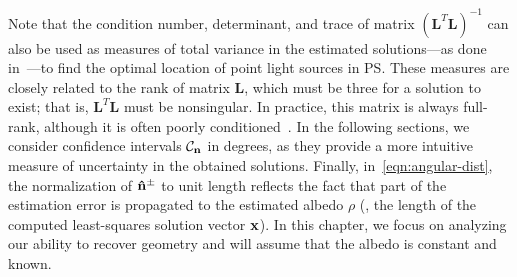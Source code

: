 Note that the condition number, determinant, and trace of matrix $(\mathbf{L}^T\mathbf{L})^{-1}$ can also be used as measures of total variance in the estimated solutions---as done in~\cite{sun-ivc-07}---to find the optimal location of point light sources in PS. These measures are closely related to the rank of matrix $\mathbf{L}$, which must be three for a solution to exist; that is, $\mathbf{L}^T\mathbf{L}$ must be nonsingular. In practice, this matrix is always full-rank, although it is often poorly conditioned~\cite{shen-pg-14}. In the following sections, we consider confidence intervals $\mathcal{C}_{\bf n}$ in degrees, as they provide a more intuitive measure of uncertainty in the obtained solutions. Finally, in~\eqref{eqn:angular-dist}, the normalization of ${\bf \hat n}^\pm$ to unit length reflects the fact that part of the estimation error is propagated to the estimated albedo $\rho$ (\ie, the length of the computed least-squares solution vector ${\bf x}$). In this chapter, we focus on analyzing our ability to recover geometry and will assume that the albedo is constant and known.



